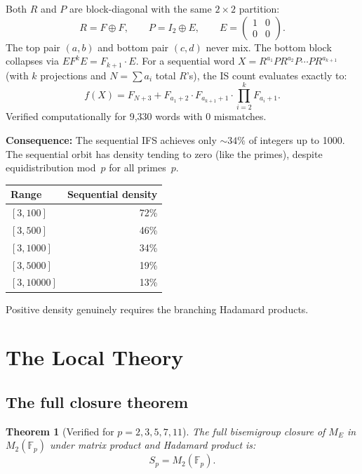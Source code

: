 \documentclass[11pt,a4paper]{article}
\newtheorem{theorem}{Theorem}
\theoremstyle{definition}
\theoremstyle{remark}
\newcommand{\FF}{\mathbb{F}}
\begin{document}
Both $R$ and $P$ are block-diagonal with the same $2 \times 2$ partition:
\[
R = F \oplus F, \qquad P = I_2 \oplus E, \qquad E = \begin{pmatrix}1&0\\0&0\end{pmatrix}.
\]
The top pair $(a,b)$ and bottom pair $(c,d)$ never mix. The bottom block collapses via $E F^k E = F_{k+1} \cdot E$. For a sequential word $X = R^{a_1} P R^{a_2} P \cdots P R^{a_{k+1}}$ (with $k$ projections and $N = \sum a_i$ total $R$'s), the IS count evaluates exactly to:
\[
f(X) = F_{N+3} + F_{a_1+2} \cdot F_{a_{k+1}+1} \cdot \prod_{i=2}^{k} F_{a_i+1}.
\]
Verified computationally for 9{,}330 words with 0 mismatches.

\textbf{Consequence:} The sequential IFS achieves only ${\sim}34\%$ of integers up to 1000. The sequential orbit has density tending to zero (like the primes), despite equidistribution mod~$p$ for all primes~$p$.

\begin{center}
\begin{tabular}{lr}
\toprule
Range & Sequential density \\
\midrule
$[3, 100]$ & 72\% \\
$[3, 500]$ & 46\% \\
$[3, 1000]$ & 34\% \\
$[3, 5000]$ & 19\% \\
$[3, 10000]$ & 13\% \\
\bottomrule
\end{tabular}
\end{center}

Positive density genuinely requires the branching Hadamard products.

\section{The Local Theory}

\subsection{The full closure theorem}

\begin{theorem}[Verified for $p = 2, 3, 5, 7, 11$]
\label{thm:full-closure}
The full bisemigroup closure of $M_E$ in $M_2(\FF_p)$ under matrix product and Hadamard product is:
\[
S_p = M_2(\FF_p).
\]
\end{theorem}
\end{document}
